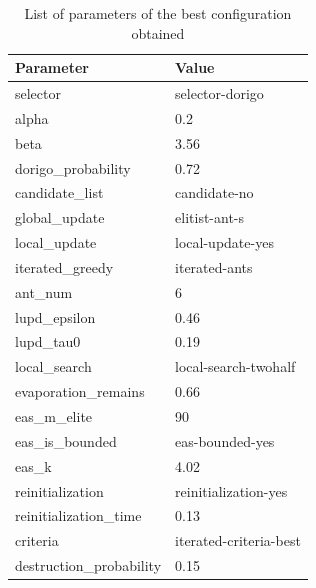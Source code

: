 \documentclass[11pt,a4paper,oneside]{book}
\begin{document}
\begin{table}[]
\centering
\caption{List of parameters of the best configuration obtained}
\label{tbl:obtained}
\begin{tabular}{|l|l|}
\hline
\textbf{Parameter}       & \textbf{Value}         \\ \hline
selector                 & selector-dorigo        \\ \hline
alpha                    & 0.2                    \\ \hline
beta                     & 3.56                   \\ \hline
dorigo\_probability      & 0.72                   \\ \hline
candidate\_list          & candidate-no           \\ \hline
global\_update           & elitist-ant-s          \\ \hline
local\_update            & local-update-yes       \\ \hline
iterated\_greedy         & iterated-ants          \\ \hline
ant\_num                 & 6                      \\ \hline
lupd\_epsilon            & 0.46                   \\ \hline
lupd\_tau0               & 0.19                   \\ \hline
local\_search            & local-search-twohalf   \\ \hline
evaporation\_remains     & 0.66                   \\ \hline
eas\_m\_elite            & 90                     \\ \hline
eas\_is\_bounded         & eas-bounded-yes        \\ \hline
eas\_k                   & 4.02                   \\ \hline
reinitialization         & reinitialization-yes   \\ \hline
reinitialization\_time   & 0.13                   \\ \hline
criteria                 & iterated-criteria-best \\ \hline
destruction\_probability & 0.15                   \\ \hline
\end{tabular}
\end{table}
\end{document}
